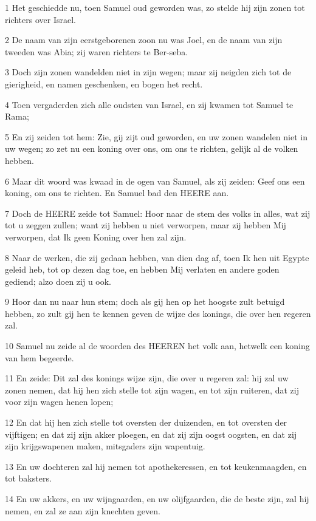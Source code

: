 \par 1 Het geschiedde nu, toen Samuel oud geworden was, zo stelde hij zijn zonen tot richters over Israel.
\par 2 De naam van zijn eerstgeborenen zoon nu was Joel, en de naam van zijn tweeden was Abia; zij waren richters te Ber-seba.
\par 3 Doch zijn zonen wandelden niet in zijn wegen; maar zij neigden zich tot de gierigheid, en namen geschenken, en bogen het recht.
\par 4 Toen vergaderden zich alle oudsten van Israel, en zij kwamen tot Samuel te Rama;
\par 5 En zij zeiden tot hem: Zie, gij zijt oud geworden, en uw zonen wandelen niet in uw wegen; zo zet nu een koning over ons, om ons te richten, gelijk al de volken hebben.
\par 6 Maar dit woord was kwaad in de ogen van Samuel, als zij zeiden: Geef ons een koning, om ons te richten. En Samuel bad den HEERE aan.
\par 7 Doch de HEERE zeide tot Samuel: Hoor naar de stem des volks in alles, wat zij tot u zeggen zullen; want zij hebben u niet verworpen, maar zij hebben Mij verworpen, dat Ik geen Koning over hen zal zijn.
\par 8 Naar de werken, die zij gedaan hebben, van dien dag af, toen Ik hen uit Egypte geleid heb, tot op dezen dag toe, en hebben Mij verlaten en andere goden gediend; alzo doen zij u ook.
\par 9 Hoor dan nu naar hun stem; doch als gij hen op het hoogste zult betuigd hebben, zo zult gij hen te kennen geven de wijze des konings, die over hen regeren zal.
\par 10 Samuel nu zeide al de woorden des HEEREN het volk aan, hetwelk een koning van hem begeerde.
\par 11 En zeide: Dit zal des konings wijze zijn, die over u regeren zal: hij zal uw zonen nemen, dat hij hen zich stelle tot zijn wagen, en tot zijn ruiteren, dat zij voor zijn wagen henen lopen;
\par 12 En dat hij hen zich stelle tot oversten der duizenden, en tot oversten der vijftigen; en dat zij zijn akker ploegen, en dat zij zijn oogst oogsten, en dat zij zijn krijgswapenen maken, mitsgaders zijn wapentuig.
\par 13 En uw dochteren zal hij nemen tot apothekeressen, en tot keukenmaagden, en tot baksters.
\par 14 En uw akkers, en uw wijngaarden, en uw olijfgaarden, die de beste zijn, zal hij nemen, en zal ze aan zijn knechten geven.
